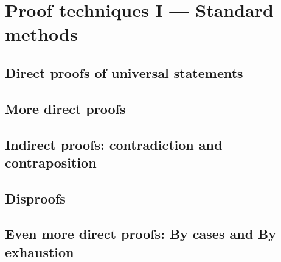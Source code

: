 

\chapter[Proof techniques I]{Proof techniques I --- Standard methods}
\label{ch:proof1}



\clearpage 

\section{Direct proofs of universal statements}
\label{sec:direct}









\newpage
\section{More direct proofs}
\label{sec:more}





\newpage

\section[Contradiction and contraposition]{Indirect proofs: contradiction and contraposition}
\label{sec:contra}




\newpage

\section{Disproofs}
\label{sec:disproofs}





\newpage

\section[By cases and By exhaustion]{Even more direct proofs: By cases and By exhaustion}
\label{sec:cases}


